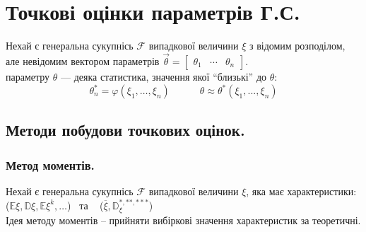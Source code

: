 \section{Точкові оцінки параметрів Г.С.}
\vspace*{-2em}
Нехай є генеральна сукупнісь $\mathcal{F}$ випадкової величини $\xi$ з відомим розподілом, але невідомим вектором параметрів $\overrightarrow{\theta} = \begin{bmatrix}
 \theta_1 & \cdots & \theta_n
\end{bmatrix}$.\\
  параметру $\theta$ --- деяка статистика, значення  якої ``близькі'' до $\theta$:
$$
\theta_n^* = \varphi(\xi_1 , \dots, \xi_n) \qquad \quad \theta \approx \theta^* (\xi_1 , ... , \xi_n)
$$
\vspace*{-4.5em}
\subsection{Методи побудови точкових оцінок.}
\vspace*{-1em}
\subsubsection{Метод моментів.}
\vspace*{-1em}
Нехай є генеральна сукупнісь $\mathcal{F}$ випадкової величини $\xi$, яка має характеристики:\\
{\centering
	 ($\mathbb{E}\xi, \mathbb{D}\xi, \mathbb{E} \xi^k , \dots$)
	\ та \
	  ($\overline{\xi}, \mathbb{D}^{*, **,***}_\xi$)\\
}
Ідея методу моментів -- прийняти вибіркові значення характеристик за теоретичні.
\vspace*{-1.5em}
